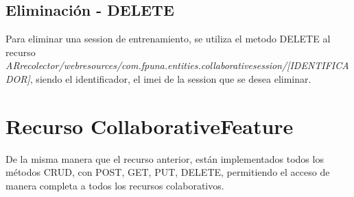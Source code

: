 \subsection{Eliminación - DELETE}

Para eliminar una session de entrenamiento, se utiliza el metodo DELETE al recurso \textit{ARrecolector/webresources/com.fpuna.entities.collaborativesession/[IDENTIFICADOR]}, siendo el identificador, el imei de la session que se desea eliminar. 

\section{Recurso CollaborativeFeature}

De la misma manera que el recurso anterior, están implementados todos los métodos CRUD, con POST, GET, PUT, DELETE, permitiendo el acceso de manera completa a todos los recursos colaborativos.